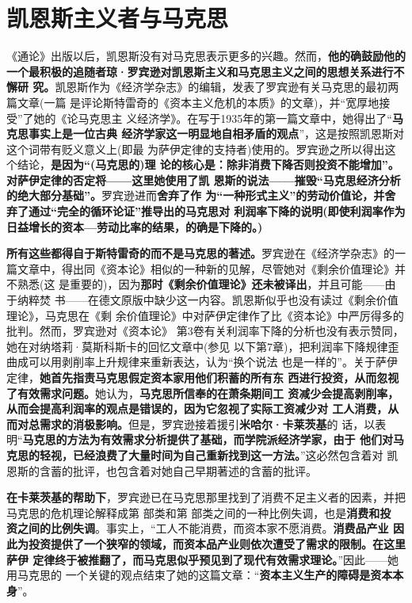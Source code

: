 \section{凯恩斯主义者与马克思}
《通论》出版以后，凯恩斯没有对马克思表示更多的兴趣。然而，\textbf{他的确鼓励他的
  一个最积极的追随者琼·罗宾逊对凯恩斯主义和马克思主义之间的思想关系进行不懈研
  究。}凯恩斯作为《经济学杂志》的编辑，发表了罗宾逊有关马克思的最初两篇文章(一篇
是评论斯特雷奇的《资本主义危机的本质》的文章)，并“宽厚地接受”了她的《论马克思主
义经济学》。在写于1935年的第一篇文章中，她得出了“\textbf{马克思事实上是一位古典
  经济学家这一明显地自相矛盾的观点}”，这是按照凯恩斯对这个词带有贬义意义上(即最
为萨伊定律的支持者)使用的。罗宾逊之所以得出这个结论，\textbf{是因为“(马克思的)理
  论的核心是：除非消费下降否则投资不能增加”。对萨伊定律的否定将——这里她使用了凯
  恩斯的说法——摧毁“马克思经济分析的绝大部分基础”。}罗宾逊进而\textbf{舍弃了作
  为“一种形式主义”的劳动价值论，并舍弃了通过“完全的循环论证”推导出的马克思对
  利润率下降的说明(即使利润率作为日益增长的资本—劳动比率的结果，的确是下降的。)}

\textbf{所有这些都得自于斯特雷奇的而不是马克思的著述。}罗宾逊在《经济学杂志》的一
篇文章中，得出同《资本论》相似的一种新的见解，尽管她对《剩余价值理论》并不熟悉(这
是重要的)，因为\textbf{那时《剩余价值理论》还未被译出}，并且可能——由于纳粹焚
书——在德文原版中缺少这一内容。凯恩斯似乎也没有读过《剩余价值理论》，马克思在《剩
余价值理论》中对萨伊定律作了比《资本论》中严厉得多的批判。然而，罗宾逊对《资本论》
第3卷有关利润率下降的分析也没有表示赞同，她在对纳塔莉·莫斯科斯卡的回忆文章中(参见
以下第7章)，把利润率下降规律歪曲成可以用剥削率上升规律来重新表达，认为“换个说法
也是一样的”。关于萨伊定律，\textbf{她首先指责马克思假定资本家用他们积蓄的所有东
  西进行投资，从而忽视了有效需求问题。}她认为，\textbf{马克思所信奉的在萧条期间工
  资减少会提高剥削率，从而会提高利润率的观点是错误的，因为它忽视了实际工资减少对
  工人消费，从而对总需求的消极影响。}但是，罗宾逊接着援引\textbf{米哈尔·卡莱茨基}的
话，以表明“\textbf{马克思的方法为有效需求分析提供了基础，而学院派经济学家，由于
  他们对马克思的轻视，已经浪费了大量时间为自己重新找到这一方法。}”这必然包含着对
凯恩斯的含蓄的批评，也包含着对她自己早期著述的含蓄的批评。

\textbf{在卡莱茨基的帮助下}，罗宾逊已在马克思那里找到了消费不足主义者的因素，并把
马克思的危机理论解释成第 部类和第 部类之间的一种比例失调，也是\textbf{消费和投
  资之间的比例失调}。事实上，“工人不能消费，而资本家不愿消费。\textbf{消费品产业
  因此为投资提供了一个狭窄的领域，而资本品产业则依次遭受了需求的限制。在这里萨伊
  定律终于被推翻了，而马克思似乎预见到了现代有效需求理论。}”因此——她用马克思的
一个关键的观点结束了她的这篇文章：“\textbf{资本主义生产的障碍是资本本身}”。

